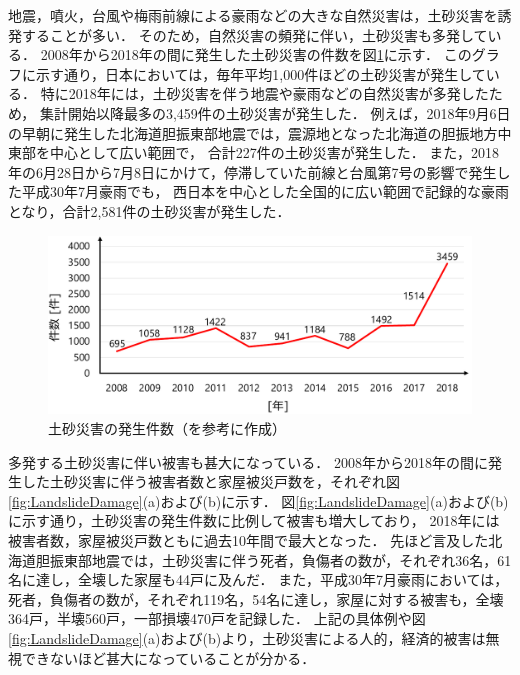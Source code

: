 \clearpage

地震，噴火，台風や梅雨前線による豪雨などの大きな自然災害は，土砂災害を誘発することが多い\cite{国交省2007}．
そのため，自然災害の頻発に伴い，土砂災害も多発している．
2008年から2018年の間に発生した土砂災害の件数を図\ref{fig:LandslideN}に示す．
このグラフに示す通り，日本においては，毎年平均1,000件ほどの土砂災害が発生している．
特に2018年には，土砂災害を伴う地震や豪雨などの自然災害が多発したため，
集計開始以降最多の3,459件の土砂災害が発生した．
例えば，2018年9月6日の早朝に発生した北海道胆振東部地震では，震源地となった北海道の胆振地方中東部を中心として広い範囲で，
合計227件の土砂災害が発生した\cite{国交省2019}．
また，2018年の6月28日から7月8日にかけて，停滞していた前線と台風第7号の影響で発生した平成30年7月豪雨でも，
西日本を中心とした全国的に広い範囲で記録的な豪雨となり，合計2,581件の土砂災害が発生した\cite{気象庁2018}．

\begin{figure}[b]
	\begin{center}	
	\includegraphics[width=12.5cm]{./Ch1_Introduction/Fig/土砂災害発生件数_compressed.pdf}
	\caption{土砂災害の発生件数（\cite{国交省2019}を参考に作成）}\label{fig:LandslideN}
	\vspace{3cm} %
	\end{center}
\end{figure}

\clearpage

多発する土砂災害に伴い被害も甚大になっている．
2008年から2018年の間に発生した土砂災害に伴う被害者数と家屋被災戸数を，それぞれ図\ref{fig:LandslideDamage}(a)および(b)に示す．
図\ref{fig:LandslideDamage}(a)および(b)に示す通り，土砂災害の発生件数に比例して被害も増大しており，
2018年には被害者数，家屋被災戸数ともに過去10年間で最大となった．
先ほど言及した北海道胆振東部地震では，土砂災害に伴う死者，負傷者の数が，それぞれ36名，61名に達し，全壊した家屋も44戸に及んだ．
また，平成30年7月豪雨においては，死者，負傷者の数が，それぞれ119名，54名に達し，家屋に対する被害も，全壊364戸，半壊560戸，一部損壊470戸を記録した．
上記の具体例や図\ref{fig:LandslideDamage}(a)および(b)より，土砂災害による人的，経済的被害は無視できないほど甚大になっていることが分かる．

